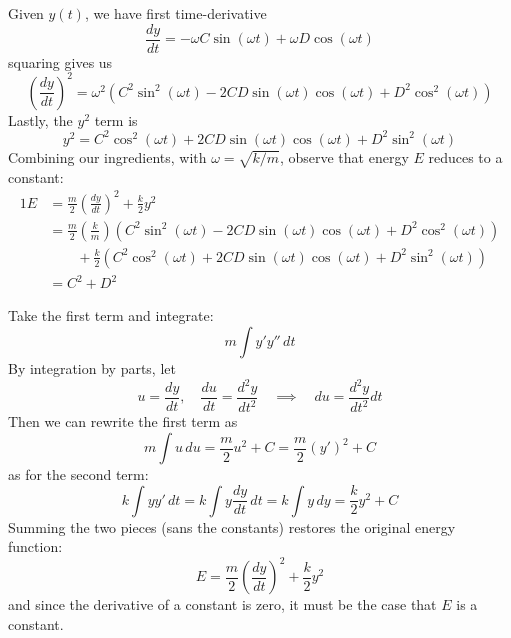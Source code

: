 \documentclass[a4paper]{article}
\begin{document}
Given \(y \!\left( t \right) \), we have first time-derivative
\[
	\frac{d y}{d t} = - \omega C \sin\left( \omega t \right) + \omega D \cos\left( \omega t \right)
\]
squaring gives us
\[
	\!\left( \frac{d y}{d t}  \right)^{2} = \omega^{2} \!\left( C^{2} \sin^{2}\left( \omega t \right) - 2 CD \sin\left( \omega t \right) \cos\left( \omega t \right) + D^{2}\cos^{2}\left( \omega t \right) \right)
\]
Lastly, the \(y^{2}\) term is
\[
	y^{2} = C^{2} \cos^{2}\left( \omega t \right) + 2CD \sin\left( \omega t \right)\cos\left( \omega t \right) + D^{2}\sin^{2}\left( \omega t \right)
\]
Combining our ingredients, with \(\omega = \sqrt{k / m}\), observe that energy \(E\) reduces to a constant:
\begin{alignat*}{1}
	E & = \frac{m}{2} \!\left( \frac{d y}{d t}  \right)^{2} + \frac{k}{2} y^{2} \\
	  & = \frac{m}{2} \!\left( \frac{k}{m} \right) \!\left( C^{2}\sin^{2}\left( \omega t \right) - 2CD \sin\left( \omega t \right) \cos\left( \omega t \right) + D^{2} \cos^{2}\left( \omega t \right)\right)  \\ 
	  & \qquad + \frac{k}{2} \!\left( C^{2} \cos^{2}\left( \omega t \right) + 2CD \sin\left( \omega t \right)\cos\left( \omega t \right) + D^{2}\sin^{2}\left( \omega t \right) \right) \\
	  & = C^{2} + D^{2}
\end{alignat*}

\newpage


Take the first term and integrate:
\[
	m \int y'y'' \, dt
\]
By integration by parts, let
\[
	u = \frac{d y}{d t}, \quad \frac{d u}{d t} = \frac{d^{2}y}{d t^{2}} \quad \implies \quad du = \frac{d^{2}y}{d t^{2}} dt 
\]
Then we can rewrite the first term as
\[
	m \int u \, du = \frac{m}{2}u^{2} + C = \frac{m}{2} \!\left( y' \right)^{2} + C 
\]
as for the second term:
\[
	k \int yy' \, dt = k \int y \frac{d y}{d t}  \, dt = k \int y \, dy = \frac{k}{2}y^{2} + C 
\]
Summing the two pieces (sans the constants) restores the original energy function:
\[
	E = \frac{m}{2} \!\left( \frac{d y}{d t}  \right)^{2} + \frac{k}{2}y^{2}
\]
and since the derivative of a constant is zero, it must be the case that \(E\) is a constant.

\vspace{12pt}
\end{document}
